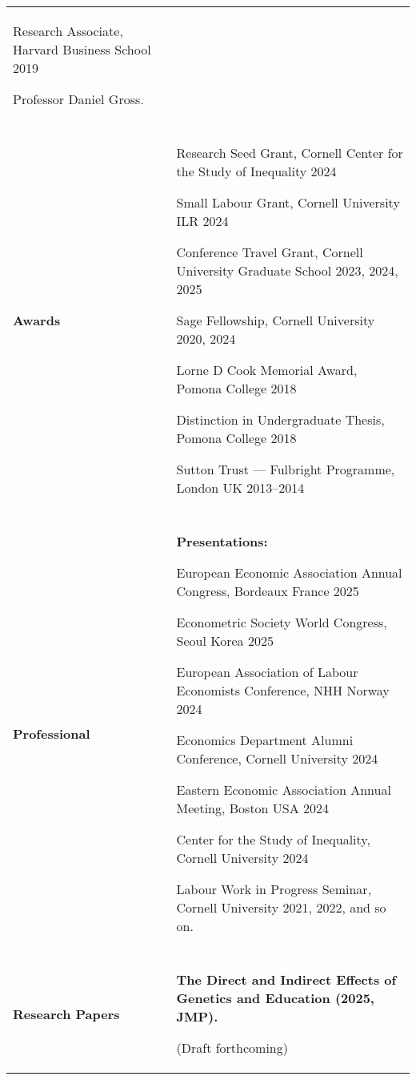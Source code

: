 \documentclass[letterpaper,11pt,oneside]{article}
\begin{document}
\begin{longtable}[\textwidth]{p{} p{}}
    Research Associate, Harvard Business School \hfill 2019

    \indent\hspace{1cm} Professor Daniel Gross. \\ \\

\textbf{Awards}
    & Research Seed Grant, Cornell Center for the Study of Inequality \hfill 2024
    
    Small Labour Grant, Cornell University ILR \hfill 2024
    
    Conference Travel Grant, Cornell University Graduate School \hfill 2023, 2024, 2025
    
    Sage Fellowship, Cornell University \hfill 2020, 2024
    
    Lorne D Cook Memorial Award, Pomona College \hfill 2018
    
    Distinction in Undergraduate Thesis, Pomona College \hfill 2018
    
    Sutton Trust --- Fulbright Programme, London UK \hfill 2013--2014 \\ \\

\textbf{Professional}
    & \textbf{Presentations:}

    European Economic Association Annual Congress, Bordeaux France \hfill 2025

    Econometric Society World Congress, Seoul Korea \hfill 2025

    European Association of Labour Economists Conference, NHH Norway \hfill 2024

    Economics Department Alumni Conference, Cornell University \hfill 2024

    Eastern Economic Association Annual Meeting, Boston USA \hfill 2024

    Center for the Study of Inequality, Cornell University \hfill 2024

    Labour Work in Progress Seminar, Cornell University \hfill 2021, 2022, and so on. \\ \\

\textbf{Research Papers}
    & \textbf{The Direct and Indirect Effects of Genetics and Education (2025, JMP).}

    (Draft forthcoming)


\end{longtable}
\end{document}
